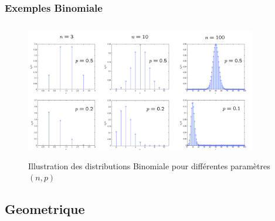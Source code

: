 \documentclass{beamer}
\begin{document}
\begin{frame}[t]
  \frametitle{Exemples Binomiale}
    \begin{figure}
    \centering
    \includegraphics[width=0.9\textwidth, height=6cm]{./binomial_set.png}
    \caption{Illustration des distributions Binomiale pour différentes paramètres
    $(n,p)$}
    \label{fig:binom}
  \end{figure}
\end{frame}
\subsection{Geometrique}
\end{document}
